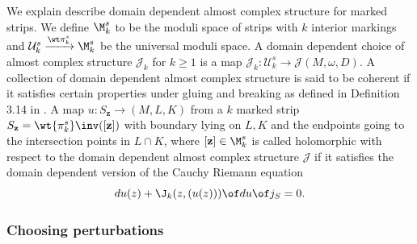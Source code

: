 We explain describe domain dependent almost complex structure for marked strips. We define $\M^s_k$ to be the moduli space of strips with $k$ interior markings and $\mathcal{U}^s_k \xrightarrow{\wt \pi^s_k} \M^s_k$ be the universal moduli space. A domain dependent choice of almost complex structure $\mathcal {J}_k$ for $k\geq 1$ is a map $\mathcal{J}_k : \mathcal{U}^s_k \to \mathcal{J}(M,\omega,D)$. A collection of domain dependent almost complex structure is said to be coherent if it satisfies certain properties under gluing and breaking as defined in Definition 3.14 in \cite{charwoodstabil}. A map $u:S_{\textbf{z}} \to (M,L,K)$  from a $k$ marked strip $S_{\textbf{z}} = \wt {\pi^s_k} \inv ([\textbf{z}]) $ with boundary lying on $L,K$ and the endpoints going to the intersection points in $L\cap K $, where $[\textbf{z}] \in \M^s_k$ is called  holomorphic with respect to the domain dependent almost complex structure $\mathcal{J}$ if it satisfies the domain dependent version of the Cauchy Riemann equation 
\begin{equation*}
   du(z) + \J_k(z,(u(z)))\of du \of j_S = 0 .
\end{equation*}


\subsubsection{Choosing perturbations}\label{ssec:cp}


